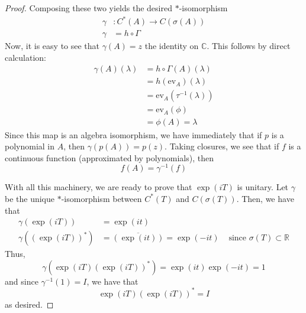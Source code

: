 \documentclass[fontsize=11pt]{scrartcl} %
\numberwithin{equation}{section} %
\numberwithin{figure}{section} %
\numberwithin{table}{section} %
\newcommand{\R}{\mathbb{R}}
\newcommand{\C}{\mathbb{C}}
\begin{document}
\begin{proof}
    Composing these two yields the desired $*$-isomorphism
    \[
        \begin{aligned}
    \gamma&:C^*(A)\to C(\sigma(A))\\
    \gamma &= h\circ \Gamma
\end{aligned}
    \]
    Now, it is easy to see that $\gamma(A) = z$ the identity on $\C$. This
    follows by direct calculation:
    \[
        \begin{aligned}
            \gamma(A)(\lambda) &= h\circ\Gamma(A)(\lambda)\\
            &= h(\text{ev}_A)(\lambda)\\
            &= \text{ev}_A(\tau^{-1}(\lambda))\\
            &= \text{ev}_A(\phi)\\
            &=\phi(A) = \lambda
    \end{aligned}
    \]
    Since this map is an algebra isomorphism, we have immediately that if $p$ is
    a polynomial in $A$, then $\gamma(p(A)) = p(z)$. Taking closures, we see
    that if $f$ is a continuous function (approximated by polynomials), then
    \[
        f(A) = \gamma^{-1}(f)
    \]

    With all this machinery, we are ready to prove that $\exp(iT)$ is unitary.
    Let $\gamma$ be the unique $*$-isomorphism between $C^*(T)$ and
    $C(\sigma(T))$. Then, we have that
    \[
        \begin{aligned}
        \gamma(\exp(iT)) &= \exp(it)\\
        \gamma((\exp(iT))^*) &= \overline{(\exp(it))}=\exp(-it) &\text{ since
        $\sigma(T)\subset \R$}
    \end{aligned}
    \]
    Thus,
    \[
        \gamma(\exp(iT)(\exp(iT))^*) = \exp(it)\exp(-it) = 1
    \]
    and since $\gamma^{-1}(1)=I$, we have that
    \[
        \exp(iT)(\exp(iT))^* = I
    \]
    as desired.
\end{proof}

\newpage
\end{document}

